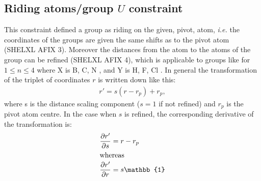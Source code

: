 \documentclass[pdf]{iucr}
\newcommand{\identity}{\mathbb{1}}
\newcommand{\partialder}[2]{\frac{\partial #1}{\partial #2}}
\begin{document}
\subsection{Riding atoms/group $U$ constraint}
This constraint defined a group as riding on the given, pivot, atom, \emph{i.e.} the coordinates of the groups are given the same shifts as to the pivot atom (SHELXL AFIX 3). Moreover the distances from the atom to the atoms of the group can be refined (SHELXL AFIX 4), which is applicable to groups like  for $1 \leq n \leq 4$ where X is B, C, N , and Y is H, F, Cl . In general the transformation of the triplet of coordinates $r$ is written down like this:
\begin{align}
r' = s(r-r_{p}) + r_{p}, \label{eqn:isometry}
\end{align}
where s is the distance scaling component ($s=1$ if not refined) and $r_{p}$ is the pivot atom centre. In the case when $s$ is refined, the corresponding derivative of the transformation is:
\begin{align}
\partialder{r'}{s} &= r-r_{p} \\
\shortintertext{whereas}
\partialder{r'}{r} &= s \identity
\end{align}
\end{document}
